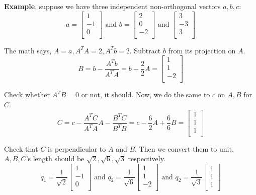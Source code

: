 \textbf{Example}, suppose we have three independent non-orthogonal vectors \(a, b, c\):
\[
    a = 
    \begin{bmatrix}
         1 \\
         -1 \\
         0 \\
    \end{bmatrix}
    \text{ and }
    b = 
    \begin{bmatrix}
         2 \\
         0 \\
         -2 \\
    \end{bmatrix}
    \text{ and }
    \begin{bmatrix}
         3 \\
         -3 \\
         3 \\
    \end{bmatrix}
\] 

The math says, \(A = a, A^T A = 2, A^T b = 2\). Subtract \(b\) from its projection on \(A\). 
\[
    B = b - \frac{A^T b}{A^T A} = b - \frac{2}{2}A = 
    \begin{bmatrix}
         1 \\
         1 \\
         -2 \\
    \end{bmatrix}
\]   

Check whether \(A^T B = 0\) or not, it should. Now, we do the same to \(c\) on \(A, B\) for \(C\). 
\[
    C = c - \frac{A^T C}{A^T A}A - \frac{B^T C}{B^T B} = c - \frac{6}{2}A + \frac{6}{6}B = 
    \begin{bmatrix}
         1 \\
         1 \\
         1 \\
    \end{bmatrix}
\]    

Check that \(C\) is perpendicular to \(A\) and \(B\). Then we convert them to unit, \(A, B, C\)'s length should be \(\sqrt{2}, \sqrt{6}, \sqrt{3}   \) respectively. 
\[
    q_1 = \frac{1}{\sqrt{2}}
    \begin{bmatrix}
         1 \\
         -1 \\
         0 \\
    \end{bmatrix}
    \text{ and }
    q_2 = \frac{1}{\sqrt{6} }
    \begin{bmatrix}
         1 \\
         1 \\
         -2 \\
    \end{bmatrix}
    \text{ and }
    q_2 = \frac{1}{\sqrt{3} }
    \begin{bmatrix}
         1 \\
         1 \\
         1 \\
    \end{bmatrix}
\]     

